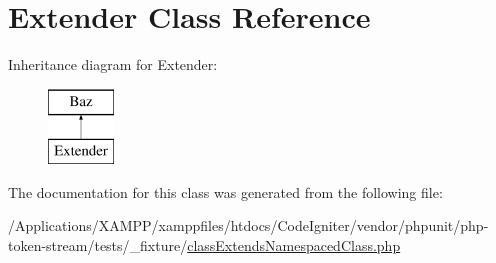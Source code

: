 \hypertarget{class_other_1_1_space_1_1_extender}{}\section{Extender Class Reference}
\label{class_other_1_1_space_1_1_extender}
Inheritance diagram for Extender\+:\begin{figure}[H]
\begin{center}
\leavevmode
\includegraphics[height=2.000000cm]{class_other_1_1_space_1_1_extender}
\end{center}
\end{figure}


The documentation for this class was generated from the following file\+:\begin{DoxyCompactItemize}
\item 
/\+Applications/\+X\+A\+M\+P\+P/xamppfiles/htdocs/\+Code\+Igniter/vendor/phpunit/php-\/token-\/stream/tests/\+\_\+fixture/\mbox{\hyperlink{class_extends_namespaced_class_8php}{class\+Extends\+Namespaced\+Class.\+php}}\end{DoxyCompactItemize}
